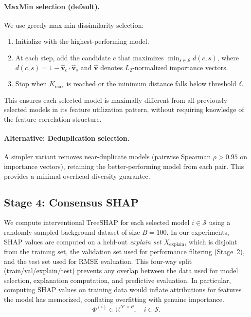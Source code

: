 \documentclass[11pt]{article}
\newcommand{\rhovar}{\rho}
\begin{document}
\paragraph{MaxMin selection (default).}
We use greedy max-min dissimilarity selection:
\begin{enumerate}
  \item Initialize with the highest-performing model.
  \item At each step, add the candidate $c$ that maximizes
    $\min_{s \in \mathcal{S}} d(c, s)$, where
    $d(c, s) = 1 - \hat{\mathbf{v}}_c \cdot \hat{\mathbf{v}}_s$
    and $\hat{\mathbf{v}}$ denotes $L_2$-normalized importance vectors.
  \item Stop when $K_{\max}$ is reached or the minimum distance falls
    below threshold $\delta$.
\end{enumerate}

This ensures each selected model is maximally different from all previously
selected models in its feature utilization pattern, without requiring
knowledge of the feature correlation structure.

\paragraph{Alternative: Deduplication selection.}
A simpler variant removes near-duplicate models (pairwise Spearman
$\rhovar > 0.95$ on importance vectors), retaining the better-performing
model from each pair. This provides a minimal-overhead diversity guarantee.

\subsection{Stage 4: Consensus SHAP}

We compute interventional TreeSHAP \citep{lundberg2020local} for each
selected model $i \in \mathcal{S}$ using a randomly sampled background
dataset of size $B = 100$. In our experiments, SHAP values are computed
on a held-out \emph{explain set} $X_{\text{explain}}$, which is disjoint
from the training set, the validation set used for performance filtering
(Stage~2), and the test set used for RMSE evaluation. This four-way split
(train/val/explain/test) prevents any overlap between the data used for
model selection, explanation computation, and predictive evaluation.
In particular, computing SHAP values on training data would inflate
attributions for features the model has memorized, conflating
overfitting with genuine importance.
\begin{equation}
  \Phi^{(i)} \in \mathbb{R}^{N' \times P}, \quad i \in \mathcal{S}.
\end{equation}
\end{document}

